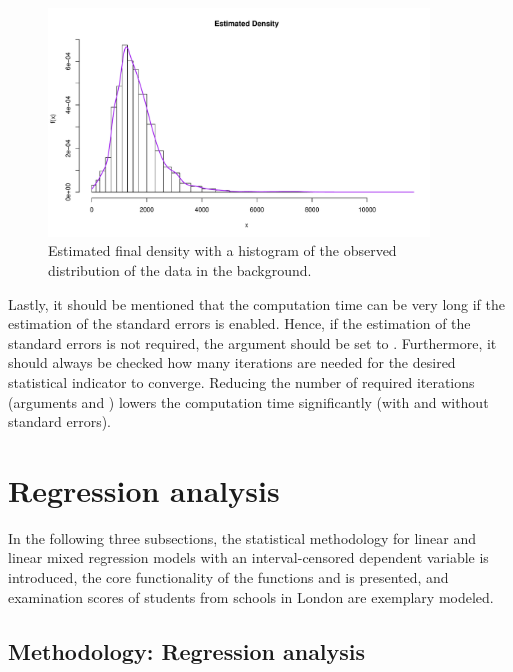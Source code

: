 \begin{figure}[ht]
  \centering
     \includegraphics[width=0.9\textwidth]{densKDE.pdf}
     \caption{Estimated final density with a histogram of the observed distribution of the data in the background.}
     \label{Fig:kdeAlgoDens}
\end{figure}

Lastly, it should be mentioned that the computation time can be very long if the estimation of the standard errors is enabled. Hence, if the estimation of the standard errors is not required, the argument  should be set to . Furthermore, it should always be checked how many iterations are needed for the desired statistical indicator to converge. Reducing the number of required iterations (arguments  and ) lowers the computation time significantly (with and without standard errors).

\section{Regression analysis}\label{Sec:RegressionR}

In the following three subsections, the statistical methodology for linear and linear mixed regression models with an interval-censored dependent variable is introduced, the core functionality of the functions  and  is presented, and  examination scores of students from schools in London are exemplary modeled.

\subsection{Methodology: Regression analysis}

